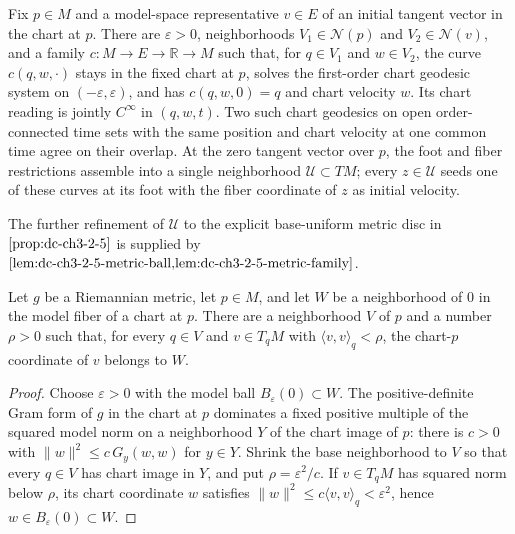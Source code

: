 \begin{lemma}
  \label{lem:dc-ch3-2-5-chart-family}


  Fix $p\in M$ and a model-space representative $v\in E$ of an initial
  tangent vector in the chart at $p$.  There are $\varepsilon>0$, neighborhoods
  $V_1\in\mathcal N(p)$ and $V_2\in\mathcal N(v)$, and a family
  $c:M\to E\to\mathbb R\to M$ such that, for $q\in V_1$ and $w\in V_2$,
  the curve $c(q,w,\cdot)$ stays in the fixed chart at $p$, solves the
  first-order chart geodesic system on $(-\varepsilon,\varepsilon)$, and has
  $c(q,w,0)=q$ and chart velocity $w$.  Its chart reading is jointly
  $C^\infty$ in $(q,w,t)$.  Two such chart geodesics on open
  order-connected time sets with the same position and chart velocity at one
  common time agree on their overlap.  At the zero tangent vector over $p$,
  the foot and fiber restrictions assemble into a single neighborhood
  $\mathcal U\subset TM$; every $z\in\mathcal U$ seeds one of these curves at
  its foot with the fiber coordinate of $z$ as initial velocity.

  The further refinement of $\mathcal U$ to the explicit base-uniform metric
  disc in $\cref{prop:dc-ch3-2-5}$ is supplied by
  $\cref{lem:dc-ch3-2-5-metric-ball,lem:dc-ch3-2-5-metric-family}$.
\end{lemma}

\begin{lemma}
  \label{lem:dc-ch3-2-5-metric-ball}


  Let $g$ be a Riemannian metric, let $p\in M$, and let $W$ be a neighborhood of
  $0$ in the model fiber of a chart at $p$.  There are a neighborhood $V$ of $p$
  and a number $\rho>0$ such that, for every $q\in V$ and
  $v\in T_qM$ with $\langle v,v\rangle_q<\rho$, the chart-$p$ coordinate of $v$
  belongs to $W$.
\end{lemma}
\begin{proof}

  Choose $\varepsilon>0$ with the model ball $B_\varepsilon(0)\subset W$.
  The positive-definite Gram form of $g$ in the chart at $p$ dominates a fixed
  positive multiple of the squared model norm on a neighborhood $Y$ of the
  chart image of $p$: there is $c>0$ with
  $\lVert w\rVert^2\le c\,G_y(w,w)$ for $y\in Y$.  Shrink the base neighborhood
  to $V$ so that every $q\in V$ has chart image in $Y$, and put
  $\rho=\varepsilon^2/c$.  If $v\in T_qM$ has squared norm below $\rho$, its
  chart coordinate $w$ satisfies
  $\lVert w\rVert^2\le c\langle v,v\rangle_q<\varepsilon^2$, hence
  $w\in B_\varepsilon(0)\subset W$.
\end{proof}

